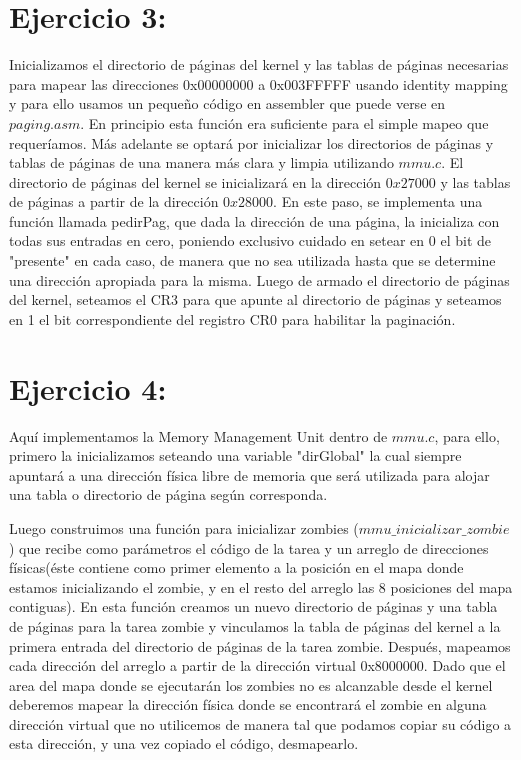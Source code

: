 \documentclass[a4paper]{article}
\begin{document}
\section{Ejercicio 3:}
%

Inicializamos el directorio de páginas del kernel y las tablas de páginas necesarias para mapear las direcciones 0x00000000 a 0x003FFFFF usando identity mapping y para ello usamos un pequeño código en assembler que puede verse en $paging.asm$. En principio esta función era suficiente para el simple mapeo que requeríamos. Más adelante se optará por inicializar los directorios de páginas y tablas de páginas de una manera más clara y limpia utilizando $mmu.c$. El directorio de páginas del kernel se inicializará en la dirección $0x27000$ y las tablas de páginas a partir de la dirección $0x28000$. En este paso, se implementa una función llamada pedirPag, que dada la dirección de una página, la inicializa con todas sus entradas en cero, poniendo exclusivo cuidado en setear en 0 el bit de "presente" en cada caso, de manera que no sea utilizada hasta que se determine una dirección apropiada para la misma. 
Luego de armado el directorio de páginas del kernel, seteamos el CR3 para que apunte al directorio de páginas y seteamos en 1 el bit correspondiente del registro CR0 para habilitar la paginación.

\section{Ejercicio 4:}
%

Aquí implementamos la Memory Management Unit dentro de $mmu.c$, para ello, primero la inicializamos seteando una variable "dirGlobal" la cual siempre apuntará a una dirección física libre de memoria que será utilizada para alojar una tabla o directorio de página según corresponda.

Luego construimos una función para inicializar zombies ($mmu\_ inicializar\_ zombie$) que recibe como parámetros el código de la tarea y un arreglo de direcciones físicas(éste contiene como primer elemento a la posición en el mapa donde estamos inicializando el zombie, y en el resto del arreglo las 8 posiciones del mapa contiguas). En esta función creamos un nuevo directorio de páginas y una tabla de páginas para la tarea zombie y vinculamos la tabla de páginas del kernel a la primera entrada del directorio de páginas de la tarea zombie. Después, mapeamos cada dirección del arreglo a partir de la dirección virtual 0x8000000. 
Dado que el area del mapa donde se ejecutarán los zombies no es alcanzable desde el kernel deberemos mapear la dirección física donde se encontrará el zombie en alguna dirección virtual que no utilicemos de manera tal que podamos copiar su código a esta dirección, y una vez copiado el código, desmapearlo.
\end{document}
